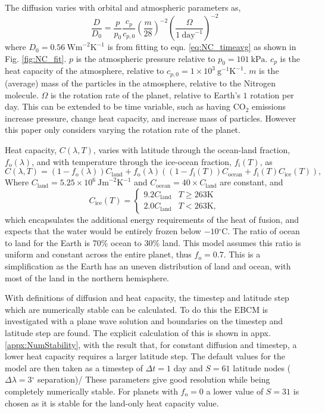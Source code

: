\documentclass[12pt, onecolumn]{revtex4-2}    %
\newcommand{\heatcap}{\ensuremath{\ \text{Jm}^{-2} \text{K}^{-1}}}
\newcommand{\diffusion}{\ensuremath{\ \text{Wm}^{-2} \text{K}^{-1}}}
\newcommand{\degrees}{\ensuremath{^{\circ}}}
\begin{document}
The diffusion varies with orbital and atmospheric parameters as,
\begin{equation}
  \frac{D}{D_0} = \frac{p}{p_0} \frac{c_p}{c_{p,0}} \left(\frac{m}{28}\right)^{-2} \left(\frac{\Omega}{1\ \text{day}^{-1}}\right)^{-2} \label{eq:diffusion_eqn}
\end{equation}
where $D_0 = 0.56 \diffusion$ is from fitting to eqn. \ref{eq:NC_timeavg} as shown in Fig. \ref{fig:NC_fit}.
$p$ is the atmospheric pressure relative to $p_0 = 101 \ \text{kPa}$.
$c_p$ is the heat capacity of the atmosphere, relative to $c_{p,0} = 1\times10^3 \ \text{g}^{-1} \text{K}^{-1}$.
$m$ is the (average) mass of the particles in the atmosphere, relative to the Nitrogen molecule.
$\Omega$ is the rotation rate of the planet, relative to Earth's $1$ rotation per day.
This can be extended to be time variable, such as having CO$_2$ emissions increase pressure, change heat capacity, and increase mass of particles.
However this paper only considers varying the rotation rate of the planet.

Heat capacity, $C(\lambda, T)$, varies with latitude through the ocean-land fraction, $f_\text{o}(\lambda)$, and with temperature through the ice-ocean fraction, $f_\text{i}(T)$, as
\begin{equation}
  C(\lambda, T) = (1 - f_\text{o}(\lambda)) C_\text{land} + f_\text{o}(\lambda) ((1-f_\text{i}(T)) C_\text{ocean} + f_\text{i}(T) C_\text{ice}(T)),
\end{equation}
Where $C_{\text{land}} = 5.25\times10^6 \heatcap$ and $C_{\text{ocean}} = 40 \times C_{\text{land}}$ are constant, and
\begin{equation}
  C_{\text{ice}}(T) =
  \begin{cases}
    9.2 C_\text{land} & T \ge 263\text{K} \\
    2.0 C_\text{land} & T < 263\text{K},
  \end{cases}
\end{equation}
which encapsulates the additional energy requirements of the heat of fusion, and expects that the water would be entirely frozen below $-10\degrees$C.
The ratio of ocean to land for the Earth is 70\% ocean to 30\% land.
This model assumes this ratio is uniform and constant across the entire planet, thus $f_\text{o} = 0.7$.
This is a simplification as the Earth has an uneven distribution of land and ocean, with most of the land in the northern hemisphere.

With definitions of diffusion and heat capacity, the timestep and latitude step which are numerically stable can be calculated.
To do this the EBCM is investigated with a plane wave solution and boundaries on the timestep and latitude step are found.
The explicit calculation of this is shown in appx. \ref{appx:NumStability}, with the result that, for constant diffusion and timestep, a lower heat capacity requires a larger latitude step.
The default values for the model are then taken as a timestep of $\Delta t = 1$ day and $S = 61$ latitude nodes ($\Delta \lambda = 3\degrees$ separation)/
These parameters give good resolution while being completely numerically stable.
For planets with $f_\text{o} = 0$ a lower value of $S=31$ is chosen as it is stable for the land-only heat capacity value.
\end{document}
